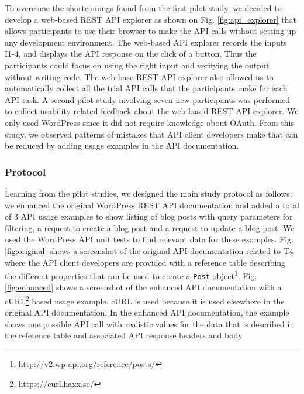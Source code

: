 \documentclass[conference]{IEEEtran}
\begin{document}
To overcome the shortcomings found from the first pilot study, we decided to develop a web-based REST API explorer as shown on Fig. \ref{fig:api_explorer} that allows participants to use their browser to make the API calls without setting up any development environment. The web-based API explorer records the inputs I1-4, and displays the API response on the click of a button. Thus the participants could focus on using the right input and verifying the output without writing code. The web-base REST API explorer also allowed us to automatically collect all the trial API calls that the participants make for each API task. A second pilot study involving seven new participants was performed to collect usability related feedback about the web-based REST API explorer. We only used WordPress since it did not require knowledge about OAuth. From this study, we observed patterns of mistakes that API client developers make that can be reduced by adding usage examples in the API documentation.

\subsubsection{Protocol}
\label{sub:protocol}
Learning from the pilot studies, we designed the main study protocol as follows: we enhanced the original WordPress REST API documentation and added a total of 3 API usage examples to show listing of blog posts with query parameters for filtering, a request to create a blog post and a request to update a blog post. We used the WordPress API unit tests to find relevant data for these examples. Fig. \ref{fig:original} shows a screenshot of the original API documentation related to T4 where the API client developers are provided with a reference table describing the different properties that can be used to create a \lstinline{Post} object\footnote{\url{http://v2.wp-api.org/reference/posts/}}. Fig. \ref{fig:enhanced} shows a screenshot of the enhanced API documentation with a cURL\footnote{\url{https://curl.haxx.se/}} based usage example. cURL is used because it is used elsewhere in the original API documentation. In the enhanced API documentation, the example shows one possible API call with realistic values for the data that is described in the reference table and associated API response headers and body.
\end{document}
